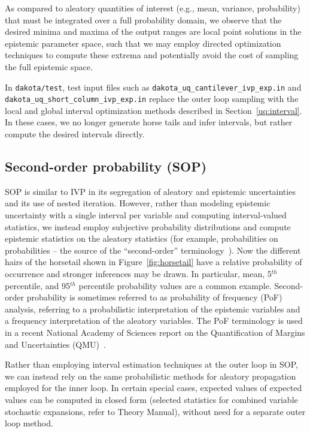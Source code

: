 As compared to aleatory quantities of interest (e.g., mean, variance,
probability) that must be integrated over a full probability domain,
we observe that the desired minima and maxima of the output ranges are
local point solutions in the epistemic parameter space, such that we
may employ directed optimization techniques to compute these extrema
and potentially avoid the cost of sampling the full epistemic space.

In \texttt{dakota/test}, test input files such as
\texttt{dakota\_uq\_cantilever\_ivp\_exp.in} and\\
\texttt{dakota\_uq\_short\_column\_ivp\_exp.in} replace the outer loop
sampling with the local and global interval optimization methods
described in Section~\ref{uq:interval}.  In these cases, we no longer
generate horse tails and infer intervals, but rather compute the
desired intervals directly.


\subsection{Second-order probability (SOP)} \label{adv_models:mixed_uq:sop}

SOP is similar to IVP in its segregation of aleatory and epistemic
uncertainties and its use of nested iteration. However, rather than
modeling epistemic uncertainty with a single interval per variable and
computing interval-valued statistics, we instead employ subjective
probability distributions and compute epistemic statistics on the
aleatory statistics (for example, probabilities on probabilities --
the source of the ``second-order'' terminology~\cite{goodman}).  Now
the different hairs of the horsetail shown in
Figure~\ref{fig:horsetail} have a relative probability of occurrence
and stronger inferences may be drawn.  In particular, mean, 5$^{th}$
percentile, and 95$^{th}$ percentile probability values are a common
example. Second-order probability is sometimes referred to as
probability of frequency (PoF) analysis, referring to a probabilistic
interpretation of the epistemic variables and a frequency
interpretation of the aleatory variables.  The PoF terminology is used
in a recent National Academy of Sciences report on the Quantification
of Margins and Uncertainties (QMU)~\cite{nas}.

Rather than employing interval estimation techniques at the outer loop
in SOP, we can instead rely on the same probabilistic methods for
aleatory propagation employed for the inner loop.  In certain special
cases, expected values of expected values can be computed in closed
form (selected statistics for combined variable stochastic expansions,
refer to Theory Manual), without need for a separate outer loop method.

